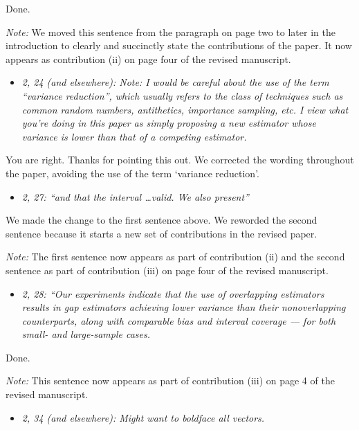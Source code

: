\documentclass[11pt,notitlepage,onecolumn]{article}
\newcommand{\noi}{\noindent}
\begin{document}
\noi
Done.
\medskip 

\noi
{\it Note:}  We moved this sentence from the paragraph on page two to later in the introduction to clearly and succinctly state the contributions of the paper. 
It now appears as contribution (ii) on page four of the revised manuscript.
\medskip 

\begin{itemize}
\item[] \textit{2, 24 (and elsewhere): Note: I would be careful about the use of the term ``variance reduction'', which usually refers to the class of techniques such as common random numbers, antithetics, importance sampling, etc. 
I view what you're doing in this paper as simply proposing a new estimator whose variance is lower than that of a competing estimator.}
\end{itemize}

\noi
You are right. 
Thanks for pointing this out. 
We corrected the wording throughout the paper, avoiding the use of the term `variance reduction'. 
\medskip 


\begin{itemize}
\item[] \textit{2, 27: ``and that the interval \ldots valid. 
We also present''}
\end{itemize}

\noi
We made the change to the first sentence above. 
We reworded the second sentence because it starts a new set of contributions in the revised paper. 
\medskip 

\noi
{\it Note:}
The first sentence now appears as part of contribution (ii) and the second sentence as part of contribution (iii) on page four of the revised manuscript. 
\medskip 

\begin{itemize}
\item[] \textit{2, 28: ``Our experiments indicate that the use of overlapping estimators results in gap estimators achieving lower variance than their nonoverlapping counterparts, along with comparable bias and interval coverage --- for both small- and large-sample cases.}
\end{itemize}

\noi
Done.
\medskip 

\noi
{\it Note:} 
This sentence now appears as part of contribution (iii) on page 4 of the revised manuscript.
\medskip 

\begin{itemize}
\item[] \textit{2, 34 (and elsewhere): Might want to boldface all vectors.}
\end{itemize}
\end{document}

